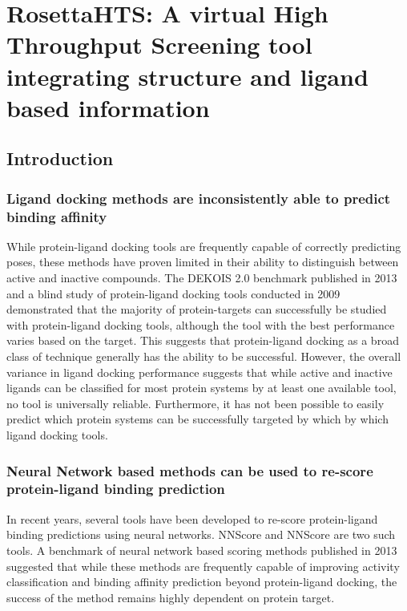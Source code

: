\chapter{RosettaHTS: A virtual High Throughput Screening tool integrating structure and ligand based information}
\label{chap:rosetta_hts}
\section{Introduction}

\subsection{Ligand docking methods are inconsistently able to predict binding affinity}

While protein-ligand docking tools are frequently capable of correctly predicting poses\citep{Trott:2010km,Friesner:2004hm,Ewing:2001wu}, these methods have proven limited in their ability to distinguish between active and inactive compounds\citep{Bauer:2013de,Huang:2006gi,Davis:2009fx}.
The DEKOIS 2.0 benchmark published in 2013 \citep{Bauer:2013de} and a blind study of protein-ligand docking tools conducted in 2009\citep{Davis:2009fx} demonstrated that the majority of protein-targets can successfully be studied with protein-ligand docking tools, although the tool with the best performance varies based on the target.
This suggests that protein-ligand docking as a broad class of technique generally has the ability to be successful. 
However, the overall variance in ligand docking performance suggests that while active and inactive ligands can be classified for most protein systems by at least one available tool, no tool is universally reliable.
Furthermore, it has not been possible to easily predict which protein systems can be successfully targeted by which by which ligand docking tools. 

\subsection{Neural Network based methods can be used to re-score protein-ligand binding prediction}

In recent years, several tools have been developed to re-score protein-ligand binding predictions using neural networks.
NNScore\citep{Durrant:2010js} and NNScore\citep{Durrant:2011dx} are two such tools.
A benchmark of neural network based scoring methods published in 2013 suggested that while these methods are frequently capable of improving activity classification and binding affinity prediction beyond protein-ligand docking, the success of the method remains highly dependent on protein target.\citep{Durrant:2013db}

